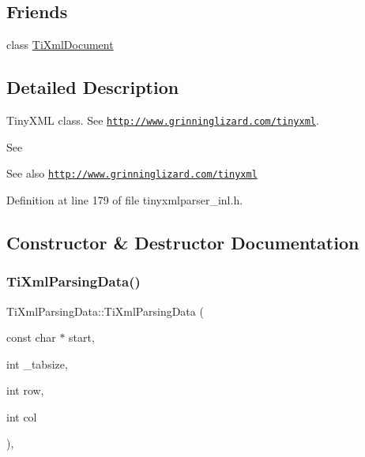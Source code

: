 \subsection*{Friends}
\begin{DoxyCompactItemize}
\item 
class \hyperlink{class_ti_xml_parsing_data_a173617f6dfe902cf484ce5552b950475}{Ti\+Xml\+Document}
\end{DoxyCompactItemize}


\subsection{Detailed Description}
Tiny\+X\+ML class. See \href{http://www.grinninglizard.com/tinyxml}{\tt http\+://www.\+grinninglizard.\+com/tinyxml}. 

See \begin{DoxySeeAlso}{See also}
\href{http://www.grinninglizard.com/tinyxml}{\tt http\+://www.\+grinninglizard.\+com/tinyxml} 
\end{DoxySeeAlso}


Definition at line 179 of file tinyxmlparser\+\_\+inl.\+h.



\subsection{Constructor \& Destructor Documentation}
\hypertarget{class_ti_xml_parsing_data_aa5beaf71579a91d6942277f417899ab9}{}\label{class_ti_xml_parsing_data_aa5beaf71579a91d6942277f417899ab9} 
\subsubsection{\texorpdfstring{Ti\+Xml\+Parsing\+Data()}{TiXmlParsingData()}}
{\footnotesize\ttfamily Ti\+Xml\+Parsing\+Data\+::\+Ti\+Xml\+Parsing\+Data (\begin{DoxyParamCaption}\item[{const char $\ast$}]{start,  }\item[{int}]{\+\_\+tabsize,  }\item[{int}]{row,  }\item[{int}]{col }\end{DoxyParamCaption})\hspace{0.3cm}{\ttfamily [inline]}, {\ttfamily [private]}}



